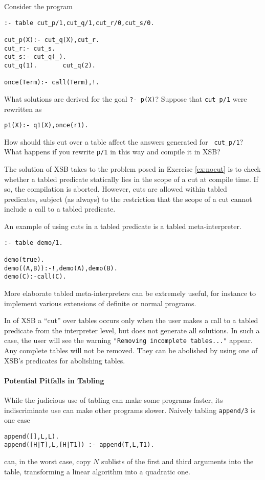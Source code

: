 \begin{exercise} \label{ex:nocut}
Consider the program
\begin{verbatim}
:- table cut_p/1,cut_q/1,cut_r/0,cut_s/0.

cut_p(X):- cut_q(X),cut_r.
cut_r:- cut_s.
cut_s:- cut_q(_).
cut_q(1).       cut_q(2).

once(Term):- call(Term),!.
\end{verbatim}
What solutions are derived for the goal {\tt ?- p(X)}?  Suppose that
{\tt cut\_p/1} were rewritten as 
\begin{verbatim}
p1(X):- q1(X),once(r1).
\end{verbatim}

How should this cut over a table affect the answers generated for {\tt
cut\_p/1}?  What happens if you rewrite {\tt p/1} in this way and
compile it in XSB?
\end{exercise}

The solution \version{} of XSB takes to the problem posed in Exercise
\ref{ex:nocut} is to check whether a tabled predicate statically lies
in the scope of a cut at compile time.  If so, the compilation is
aborted.  However, cuts are allowed within tabled predicates, subject
(as always) to the restriction that the scope of a cut cannot include
a call to a tabled predicate.  

\begin{example}
An example of using cuts in a tabled predicate is a tabled
meta-interpreter.
\begin{verbatim}
:- table demo/1.

demo(true).
demo((A,B)):-!,demo(A),demo(B).
demo(C):-call(C).
\end{verbatim}
More elaborate tabled meta-interpreters can be extremely useful, for
instance to implement various extensions of definite or normal
programs.
\end{example}

In \version{} of XSB a ``cut'' over tables occurs only when the user
makes a call to a tabled predicate from the interpreter level, but
does not generate all solutions.  In such a case, the user will see
the warning {\tt "Removing incomplete tables..."} appear.  Any
complete tables will not be removed.  They can be abolished by using
one of XSB's predicates for abolishing tables.

\paragraph*{Potential Pitfalls in Tabling}
While the judicious use of tabling can make some programs faster, its
indiscriminate use can make other programs slower.  Naively tabling
{\tt append/3} is one case
\begin{center}
\begin{minipage}{3.5in}
\begin{verbatim}
append([],L,L).
append([H|T],L,[H|T1]) :- append(T,L,T1).
\end{verbatim}						       
\end{minipage}
\end{center}
can, in the worst case, copy $N$ sublists of the first and third
arguments into the table, transforming a linear algorithm into a
quadratic one.

